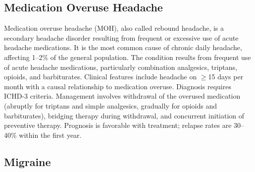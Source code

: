 


\label{sec:Neuropathic Pain Syndromes}

\subsection{Medication Overuse Headache}
\label{sec:Medication Overuse Headache}
Medication overuse headache (MOH), also called rebound headache, is a secondary headache disorder resulting from frequent or excessive use of acute headache medications. It is the most common cause of chronic daily headache, affecting 1--2\% of the general population. The condition results from frequent use of acute headache medications, particularly combination analgesics, triptans, opioids, and barbiturates. Clinical features include headache on $\ge$15 days per month with a causal relationship to medication overuse. Diagnosis requires ICHD-3 criteria. Management involves withdrawal of the overused medication (abruptly for triptans and simple analgesics, gradually for opioids and barbiturates), bridging therapy during withdrawal, and concurrent initiation of preventive therapy. Prognosis is favorable with treatment; relapse rates are 30--40\% within the first year.

\subsection{Migraine}
\label{sec:Migraine}

